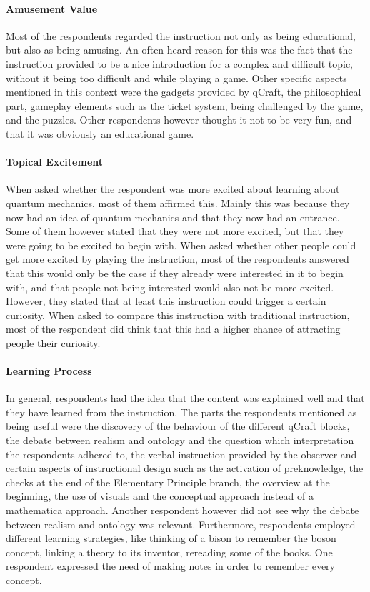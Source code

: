 \documentclass[11pt,twoside]{report} %
\begin{document}
\paragraph{Amusement Value}

Most of the respondents regarded the instruction not only as being educational, but also as being amusing. An often heard reason for this was the fact that the instruction provided to be a nice introduction for a complex and difficult topic, without it being too difficult and while playing a game. Other specific aspects mentioned in this context were the gadgets provided by qCraft, the philosophical part, gameplay elements such as the ticket system, being challenged by the game, and the puzzles. Other respondents however thought it not to be very fun, and that it was obviously an educational game.

\paragraph{Topical Excitement}

When asked whether the respondent was more excited about learning about quantum mechanics, most of them affirmed this. Mainly this was because they now had an idea of quantum mechanics and that they now had an entrance. Some of them however stated that they were not more excited, but that they were going to be excited to begin with. When asked whether other people could get more excited by playing the instruction, most of the respondents answered that this would only be the case if they already were interested in it to begin with, and that people not being interested would also not be more excited. However, they stated that at least this instruction could trigger a certain curiosity. When asked to compare this instruction with traditional instruction, most of the respondent did think that this had a higher chance of attracting people their curiosity.

\paragraph{Learning Process}

In general, respondents had the idea that the content was explained well and that they have learned from the instruction. The parts the respondents mentioned as being useful were the discovery of the behaviour of the different qCraft blocks, the debate between realism and ontology and the question which interpretation the respondents adhered to, the verbal instruction provided by the observer and certain aspects of instructional design such as the activation of preknowledge, the checks at the end of the Elementary Principle branch, the overview at the beginning, the use of visuals and the conceptual approach instead of a mathematica approach. Another respondent however did not see why the debate between realism and ontology was relevant. Furthermore, respondents employed different learning strategies, like thinking of a bison to remember the boson concept, linking a theory to its inventor, rereading some of the books. One respondent expressed the need of making notes in order to remember every concept.
\end{document}

